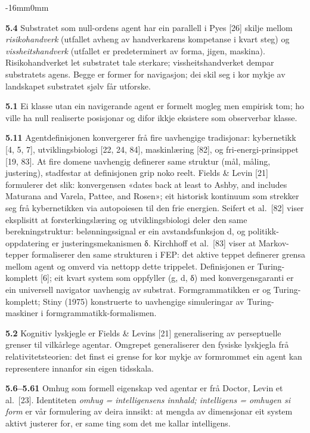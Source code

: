 \documentclass[10pt,oneside]{book}
\newcommand{\msym}[1]{{\mathfbfont #1}}
\newenvironment{widebody}{%
  \begin{adjustwidth}{-16mm}{0mm}%
}{%
  \end{adjustwidth}%
}
\begin{document}
\begin{widebody}
{\textbf{5.4} Substratet som null-ordens agent har ein parallell i Pyes [26] skilje mellom \textit{risikohandverk} (utfallet avheng av handverkarens kompetanse i kvart steg) og \textit{vissheitshandverk} (utfallet er predeterminert av forma, jigen, maskina). Risikohandverket let substratet tale sterkare; vissheitshandverket dempar substratets agens. Begge er former for navigasjon; dei skil seg i kor mykje av landskapet substratet sjølv får utforske.

\textbf{5.1} Ei klasse utan ein navigerande agent er formelt mogleg men empirisk tom; ho ville ha null realiserte posisjonar og difor ikkje eksistere som observerbar klasse.

\textbf{5.11} Agentdefinisjonen konvergerer frå fire uavhengige tradisjonar: kybernetikk [4, 5, 7], utviklingsbiologi [22, 24, 84], maskinlæring [82], og fri-energi-prinsippet [19, 83]. At fire domene uavhengig definerer same struktur (mål, måling, justering), stadfestar at definisjonen grip noko reelt. Fields \& Levin [21] formulerer det slik: konvergensen «dates back at least to Ashby, and includes Maturana and Varela, Pattee, and Rosen»; eit historisk kontinuum som strekker seg frå kybernetikken via autopoiesen til den frie energien. Seifert et al.\ [82] viser eksplisitt at forsterkingslæring og utviklingsbiologi deler den same berekningstruktur: belønningssignal er ein avstandsfunksjon d, og politikk-oppdatering er justeringsmekanismen δ. Kirchhoff et al.\ [83] viser at Markov-tepper formaliserer den same strukturen i FEP: det aktive teppet definerer grensa mellom agent og omverd via nettopp dette trippelet. Definisjonen er Turing-komplett [6]; eit kvart system som oppfyller (g, d, \msym{δ}) med konvergensgaranti er ein universell navigator uavhengig av substrat. Formgrammatikken er og Turing-komplett; Stiny (1975) konstruerte to uavhengige simuleringar av Turing-maskiner i formgrammatikk-formalismen.

\textbf{5.2} Kognitiv lyskjegle er Fields \& Levins [21] generalisering av perseptuelle grenser til vilkårlege agentar. Omgrepet generaliserer den fysiske lyskjegla frå relativitetsteorien: det finst ei grense for kor mykje av formrommet ein agent kan representere innanfor sin eigen tidsskala.

\textbf{5.6--5.61} Omhug som formell eigenskap ved agentar er frå Doctor, Levin et al.\ [23]. Identiteten \textit{omhug = intelligensens innhald; intelligens = omhugen si form} er vår formulering av deira innsikt: at mengda av dimensjonar eit system aktivt justerer for, er same ting som det me kallar intelligens.

}
\end{widebody}
\end{document}
